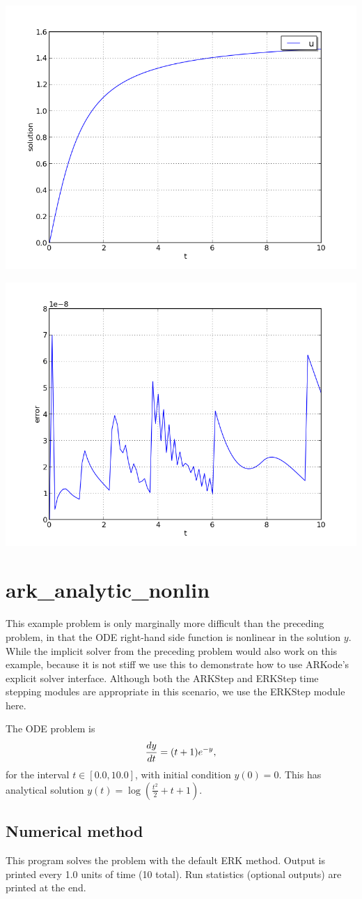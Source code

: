 \documentclass[letterpaper,10pt,english]{sphinxmanual}
\begin{document}
\includegraphics[width=0.450\linewidth]{plot-ark_analytic.png}

\includegraphics[width=0.450\linewidth]{plot-ark_analytic_error.png}


\section{ark\_analytic\_nonlin}
\label{c_serial:id2}\label{c_serial:ark-analytic-nonlin}
This example problem is only marginally more difficult than the
preceding problem, in that the ODE right-hand side function is
nonlinear in the solution \(y\).  While the implicit solver from
the preceding problem would also work on this example, because it is
not stiff we use this to demonstrate how to use ARKode's explicit
solver interface.  Although both the ARKStep and ERKStep time stepping
modules are appropriate in this scenario, we use the ERKStep module
here.

The ODE problem is
\begin{gather}
\begin{split}\frac{dy}{dt} = (t+1) e^{-y},\end{split}\notag
\end{gather}
for the interval \(t \in [0.0, 10.0]\), with initial condition
\(y(0)=0\).  This has analytical solution \(y(t) =
\log\left(\frac{t^2}{2} + t + 1\right)\).


\subsection{Numerical method}
\label{c_serial:id3}
This program solves the problem with the default ERK method.  Output
is printed every 1.0 units of time (10 total).
Run statistics (optional outputs) are printed at the end.
\end{document}

